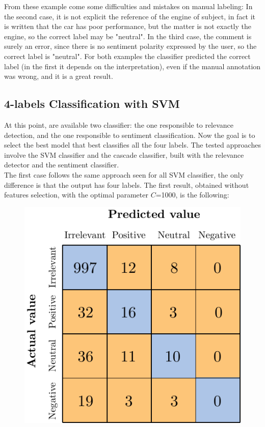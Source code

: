 From these example come some difficulties and mistakes on manual labeling: In the second case, it is not explicit the reference of the engine of subject, in fact it is written that the car has poor performance, but the matter is not exactly the engine, so the correct label may be "neutral". In the third case, the comment is surely an error, since there is no sentiment polarity expressed by the user, so the correct label is "neutral". For both examples the classifier predicted the correct label (in the first it depends on the interpretation), even if the manual annotation was wrong, and it is a great result.



\subsection{4-labels Classification with SVM}

At this point, are available two classifier: the one responsible to relevance detection, and the one responsible to sentiment classification. Now the goal is to select the best model that best classifies all the four labels. The tested approaches involve the SVM classifier and the cascade classifier, built with the relevance detector and the sentiment classifier.\\
The first case follows the same approach seen for all SVM classifier, the only difference is that the output has four labels. The first result, obtained without features selection, with the optimal parameter $C$=1000, is the following:

\begin{figure}[H]
	\centering
	\includegraphics[scale=1]{figures/conf_matrices/ita_4l_svm/ita_4l_svm_bfs.pdf}
	\label{fig:ita_4l_svm_bfs}
\end{figure}

